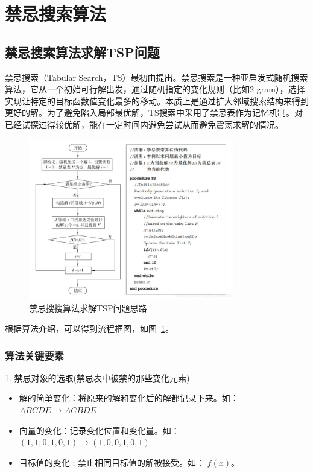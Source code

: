 \documentclass[lang=cn,11pt]{elegantpaper}
\begin{document}
\section{禁忌搜索算法}
\subsection{禁忌搜索算法求解TSP问题}
禁忌搜索（Tabular Search，TS）最初由\cite{tabusearch}提出。禁忌搜索是一种亚启发式随机搜索算法，它从一个初始可行解出发，通过随机指定的变化规则（比如2-gram），选择实现让特定的目标函数值变化最多的移动。本质上是通过扩大邻域搜索结构来得到更好的解。为了避免陷入局部最优解，TS搜索中采用了禁忌表作为记忆机制。对已经试探过得较优解，能在一定时间内避免尝试从而避免震荡求解的情况。


\begin{figure}[h]
  \centering
  \includegraphics[width=0.8\textwidth]{figure/禁忌搜索算法流程.jpg} %
  \caption{禁忌搜搜算法求解TSP问题思路 } %
   \label{tabsearch}
\end{figure}

根据算法介绍，可以得到流程框图，如图~\ref{tabsearch}。

\subsubsection{算法关键要素}
1. 禁忌对象的选取(禁忌表中被禁的那些变化元素)

        \begin{itemize}[leftmargin=50pt]
        \item 解的简单变化：将原来的解和变化后的解都记录下来。如：$ABCDE \rightarrow ACBDE  $
        \item 向量的变化：记录变化位置和变化量。如：
            $(1,1,0,1,0,1) \rightarrow (1,0,0,1,0,1)    $
        \item 目标值的变化 : 禁止相同目标值的解被接受。如：
            $f(x)$。
        \end{itemize}
\end{document}
